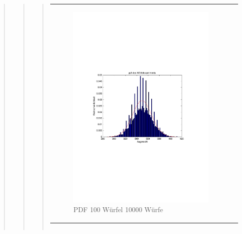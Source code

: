\begin{quote}
\begin{quote}
\begin{quote}
\begin{center}
\begin{tabular}{ll}
\begin{minipage}{0.6\textwidth}
                     \begin{figure}[H]
                        \label{fig:}
                        \includegraphics[scale=0.6, trim = 3cm 8.5cm 3.5cm 8.5cm, clip]{./Bilder/100wuerfelpdf} %
                        \caption{PDF 100 Würfel 10000 Würfe}
                    \end{figure}
               \vspace{-1.5em}

                \end{minipage}

            \end{tabular}
            \end{center}

            \begin{center}
            \begin{tabular}{ll}


\end{tabular}
\end{center}
\end{quote}
\end{quote}
\end{quote}
